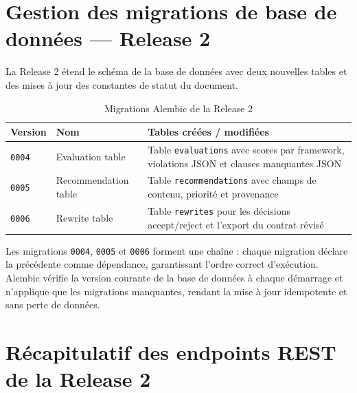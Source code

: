 \section{Gestion des migrations de base de données — Release 2}

La Release 2 étend le schéma de la base de données avec deux nouvelles tables et des mises à jour des constantes de statut du document.

\begin{table}[H]
\centering
\renewcommand{\arraystretch}{1.4}
\begin{tabular}{|p{3cm}|p{4cm}|p{7cm}|}
\hline
\textbf{Version} & \textbf{Nom} & \textbf{Tables créées / modifiées} \\
\hline
\texttt{0004} & Evaluation table & Table \texttt{evaluations} avec scores par framework, violations JSON et clauses manquantes JSON \\
\hline
\texttt{0005} & Recommendation table & Table \texttt{recommendations} avec champs de contenu, priorité et provenance \\
\hline
\texttt{0006} & Rewrite table & Table \texttt{rewrites} pour les décisions accept/reject et l'export du contrat révisé \\
\hline
\end{tabular}
\caption{Migrations Alembic de la Release 2}
\label{tab:migrations_r2}
\end{table}

Les migrations \texttt{0004}, \texttt{0005} et \texttt{0006} forment une chaîne : chaque migration déclare la précédente comme dépendance, garantissant l'ordre correct d'exécution. Alembic vérifie la version courante de la base de données à chaque démarrage et n'applique que les migrations manquantes, rendant la mise à jour idempotente et sans perte de données.

\section{Récapitulatif des endpoints REST de la Release 2}


